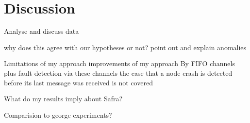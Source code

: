 \section{Discussion}

Analyse and discuss data

why does this agree with our hypotheses or not?
  point out and explain anomalies
  
Limitations of my approach
  improvements of my approach
  By FIFO channels plus fault detection via these channels the case that a node crash is detected before its last message was received is not covered
  
What do my results imply about Safra?
  
Comparision to george experiments?